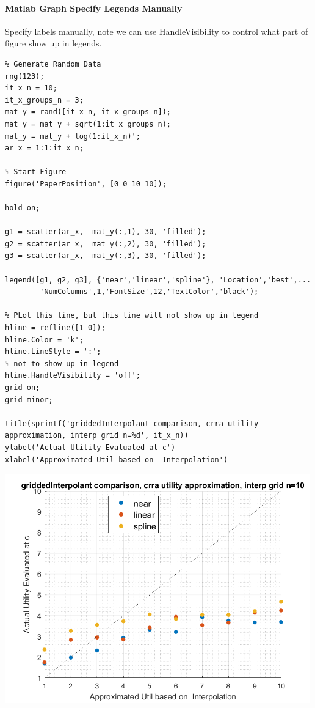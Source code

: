 \documentclass[
]{book}
\begin{document}
\hypertarget{matlab-graph-specify-legends-manually}{%
\paragraph{Matlab Graph Specify Legends Manually}\label{matlab-graph-specify-legends-manually}}

Specify labels manually, note we can use HandleVisibility to control
what part of figure show up in legends.

\begin{verbatim}
% Generate Random Data
rng(123);
it_x_n = 10;
it_x_groups_n = 3;
mat_y = rand([it_x_n, it_x_groups_n]);
mat_y = mat_y + sqrt(1:it_x_groups_n);
mat_y = mat_y + log(1:it_x_n)';
ar_x = 1:1:it_x_n;

% Start Figure
figure('PaperPosition', [0 0 10 10]);

hold on;

g1 = scatter(ar_x,  mat_y(:,1), 30, 'filled');
g2 = scatter(ar_x,  mat_y(:,2), 30, 'filled');
g3 = scatter(ar_x,  mat_y(:,3), 30, 'filled');

legend([g1, g2, g3], {'near','linear','spline'}, 'Location','best',...
        'NumColumns',1,'FontSize',12,'TextColor','black');

% PLot this line, but this line will not show up in legend
hline = refline([1 0]);
hline.Color = 'k';
hline.LineStyle = ':';
% not to show up in legend
hline.HandleVisibility = 'off';
grid on;
grid minor;

title(sprintf('griddedInterpolant comparison, crra utility approximation, interp grid n=%d', it_x_n))
ylabel('Actual Utility Evaluated at c')
xlabel('Approximated Util based on  Interpolation')
\end{verbatim}

\includegraphics[width=5.20833in,height=\textheight]{img/fs_titling_images/figure_1.png}
\end{document}
